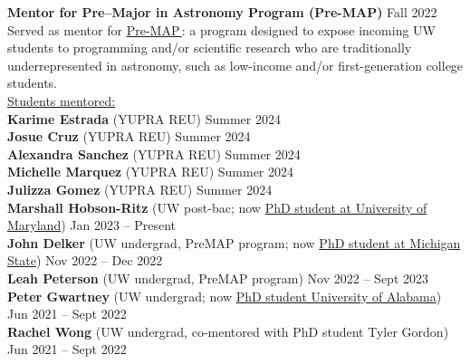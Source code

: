 \documentclass[a4,11pt]{article}
\let\orighref\href
\renewcommand{\href}[2]{\orighref{#1}{#2\,\scriptsize\faExternalLink}}
\begin{document}
\vspace{.3cm}
\textbf{Mentor for Pre–Major in Astronomy Program (Pre-MAP)} \hfill Fall 2022 \\
\vspace{.1cm}
Served as mentor for \href{http://depts.washington.edu/premap/about/}{Pre-MAP}: a program designed to expose incoming UW students to programming and/or scientific research who are traditionally underrepresented in astronomy, such as low-income and/or first-generation college students. \\

\vspace{.3cm}
\underline{Students mentored:} \\
\vspace{.1cm}
\textbf{Karime Estrada} (YUPRA REU) \hfill Summer 2024 \\
\vspace{.1cm}
\textbf{Josue Cruz} (YUPRA REU) \hfill Summer 2024 \\
\vspace{.1cm}
\textbf{Alexandra Sanchez} (YUPRA REU) \hfill Summer 2024 \\
\vspace{.1cm}
\textbf{Michelle Marquez} (YUPRA REU) \hfill Summer 2024 \\
\vspace{.1cm}
\textbf{Julizza Gomez} (YUPRA REU) \hfill Summer 2024 \\
\vspace{.1cm}
\textbf{Marshall Hobson-Ritz} (UW post-bac; now \underline{PhD student at University of Maryland}) \hfill Jan 2023 -- Present \\
\vspace{.1cm}
\textbf{John Delker} (UW undergrad, PreMAP program; now \underline{PhD student at Michigan State}) \hfill Nov 2022 -- Dec 2022 \\
\vspace{.1cm}
\textbf{Leah Peterson} (UW undergrad, PreMAP program) \hfill Nov 2022 -- Sept 2023 \\
\vspace{.1cm}
\textbf{Peter Gwartney} (UW undergrad; now \underline{PhD student University of Alabama}) \hfill Jun 2021 -- Sept 2022 \\
\vspace{.1cm}
\textbf{Rachel Wong} (UW undergrad, co-mentored with PhD student Tyler Gordon) \hfill Jun 2021 -- Sept 2022 


\clearpage
\end{document}
